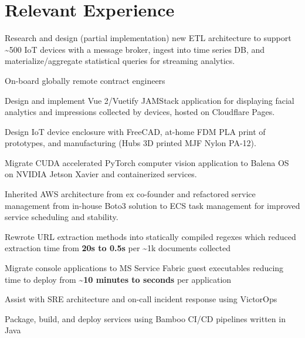 \documentclass{deedy-resume-openfont}
\begin{document}

\vspace{0.05\textwidth}
\begin{minipage}[t]{0.64 \textwidth}

	\section{Relevant Experience}
	\vspace{\topsep}
	\begin{tightemize}
		\item Research and design (partial implementation) new ETL architecture to support \textasciitilde500 IoT devices with a message broker, ingest into time series DB, and materialize/aggregate statistical queries for streaming analytics.
		\item On-board globally remote contract engineers
		\item Design and implement Vue 2/Vuetify JAMStack application for displaying facial analytics and impressions collected by devices, hosted on Cloudflare Pages.
		\item Design  IoT device enclosure with FreeCAD, at-home FDM PLA print of prototypes, and manufacturing (Hubs 3D printed MJF Nylon PA-12).
		\item Migrate CUDA accelerated PyTorch computer vision application to Balena OS on NVIDIA Jetson Xavier and containerized services. 
		\item Inherited AWS architecture from ex co-founder and refactored service management from in-house Boto3 solution to ECS task management for improved service scheduling and stability.
	\end{tightemize}
	\sectionsep
	\begin{tightemize}
		\item Rewrote URL extraction methods into statically compiled regexes which reduced extraction time from \textbf{20s to 0.5s} per \textasciitilde1k documents collected
		\item Migrate console applications to MS Service Fabric guest executables reducing time to deploy from \textbf{\textasciitilde{10 minutes to seconds}} per application
		\item Assist with SRE architecture and on-call incident response using VictorOps
		\item Package, build, and deploy services using Bamboo CI/CD pipelines written in Java
	\end{tightemize}
	\sectionsep
																																																																		

\end{minipage}
\end{document}
